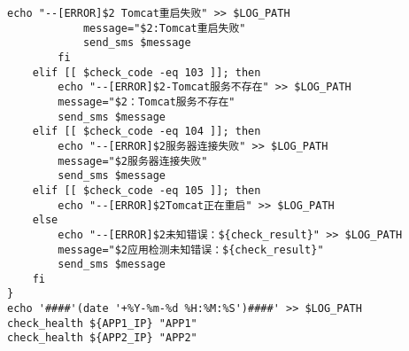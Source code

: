 \begin{lstlisting}[numbers=none]
            echo "--[ERROR]$2 Tomcat重启失败" >> $LOG_PATH
            message="$2:Tomcat重启失败"
            send_sms $message
        fi
    elif [[ $check_code -eq 103 ]]; then
        echo "--[ERROR]$2-Tomcat服务不存在" >> $LOG_PATH
        message="$2：Tomcat服务不存在"
        send_sms $message
    elif [[ $check_code -eq 104 ]]; then
        echo "--[ERROR]$2服务器连接失败" >> $LOG_PATH
        message="$2服务器连接失败"
        send_sms $message
    elif [[ $check_code -eq 105 ]]; then
        echo "--[ERROR]$2Tomcat正在重启" >> $LOG_PATH
    else
        echo "--[ERROR]$2未知错误：${check_result}" >> $LOG_PATH
        message="$2应用检测未知错误：${check_result}"
        send_sms $message
    fi
}
echo '####'(date '+%Y-%m-%d %H:%M:%S')####' >> $LOG_PATH
check_health ${APP1_IP} "APP1"
check_health ${APP2_IP} "APP2"
\end{lstlisting}